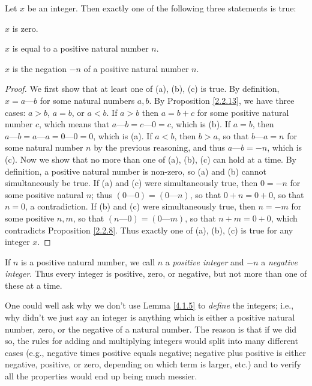 \begin{lemma}\label{4.1.5}
    Let \(x\) be an integer.
    Then exactly one of the following three statements is true:
    \begin{enumerate*}
        \item \(x\) is zero.
        \item \(x\) is equal to a positive natural number \(n\).
        \item \(x\) is the negation \(-n\) of a positive natural number \(n\).
    \end{enumerate*}
\end{lemma}

\begin{proof}
    We first show that at least one of (a), (b), (c) is true.
    By definition, \(x = a \text{---} b\) for some natural numbers \(a, b\).
    By Proposition \ref{2.2.13}, we have three cases: \(a > b\), \(a = b\), or \(a < b\).
    If \(a > b\) then \(a = b + c\) for some positive natural number \(c\), which means that \(a \text{---} b = c \text{---} 0 = c\), which is (b).
    If \(a = b\), then \(a \text{---} b = a \text{---} a = 0 \text{---} 0 = 0\), which is (a).
    If \(a < b\), then \(b > a\), so that \(b \text{---} a = n\) for some natural number \(n\) by the previous reasoning, and thus \(a \text{---} b = -n\), which is (c).
    Now we show that no more than one of (a), (b), (c) can hold at a time.
    By definition, a positive natural number is non-zero, so (a) and (b) cannot simultaneously be true.
    If (a) and (c) were simultaneously true, then \(0 = -n\) for some positive natural \(n\);
    thus \((0 \text{---} 0) = (0 \text{---} n)\), so that \(0 + n = 0 + 0\), so that \(n = 0\), a contradiction.
    If (b) and (c) were simultaneously true, then \(n = -m\) for some positive \(n, m\), so that \((n \text{---} 0) = (0 \text{---} m)\), so that \(n + m = 0 + 0\), which contradicts Proposition \ref{2.2.8}.
    Thus exactly one of (a), (b), (c) is true for any integer \(x\).
\end{proof}

\begin{note}
    If \(n\) is a positive natural number, we call \(n\) a \emph{positive integer} and \(-n\) a \emph{negative integer}.
    Thus every integer is positive, zero, or negative, but not more than one of these at a time.
\end{note}

\begin{note}
    One could well ask why we don’t use Lemma \ref{4.1.5} to \emph{define} the integers;
    i.e., why didn’t we just say an integer is anything which is either a positive natural number, zero, or the negative of a natural number.
    The reason is that if we did so, the rules for adding and multiplying integers would split into many different cases (e.g., negative times positive equals negative; negative plus positive is either negative, positive, or zero, depending on which term is larger, etc.) and to verify all the properties would end up being much messier.
\end{note}

